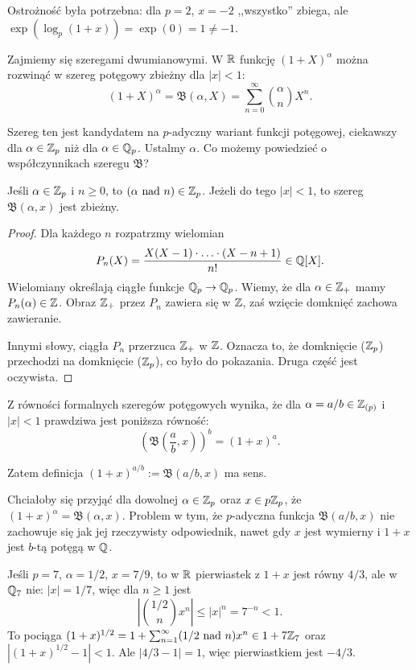 Ostrożność była potrzebna: dla $p = 2$, $x = -2$ ,,wszystko'' zbiega, ale $\exp(\log_p(1+x)) = \exp(0) = 1 \neq -1$.

Zajmiemy się szeregami dwumianowymi.
W $\mathbb{R}$ funkcję $(1+X)^\alpha$ można rozwinąć w szereg potęgowy zbieżny dla $|x| < 1$:
\[
	(1+X)^\alpha = \mathfrak B(\alpha, X) = \sum_{n=0}^\infty {\alpha \choose n} X^n.
\]

Szereg ten jest kandydatem na $p$-adyczny wariant funkcji potęgowej, ciekawszy dla $\alpha \in \mathbb{Z}_p$ niż dla $\alpha \in \mathbb{Q}_p$.
Ustalmy $\alpha$.
Co możemy powiedzieć o współczynnikach szeregu $\mathfrak B$?

\begin{fakt}
	Jeśli $\alpha \in \mathbb{Z}_p$ i $n \ge 0$, to $(\alpha \textrm{ nad } n) \in \mathbb{Z}_p$.
	Jeżeli do tego $|x| < 1$, to szereg $\mathfrak B(\alpha, x)$ jest zbieżny.
\end{fakt}

\begin{proof}
	Dla każdego $n$ rozpatrzmy wielomian
	\[
		P_n(X) = \frac{X(X-1) \cdot \ldots \cdot (X-n+1)}{n!} \in \mathbb{Q}[X].
	\]
	Wielomiany określają ciągłe funkcje $\mathbb{Q}_p \to \mathbb{Q}_p$.
	Wiemy, że dla $\alpha \in \mathbb{Z}_+$ mamy $P_n(\alpha) \in \mathbb{Z}$.
	Obraz $\mathbb{Z}_+$ przez $P_n$ zawiera się w $\mathbb{Z}$, zaś wzięcie domknięć zachowa zawieranie.

	Innymi słowy, ciągła $P_n$ przerzuca $\mathbb{Z}_+$ w $\mathbb{Z}$.
	Oznacza to, że domknięcie ($\mathbb{Z}_p$) przechodzi na domknięcie ($\mathbb{Z}_p$), co było do pokazania.
	Druga część jest oczywista.
\end{proof}

Z równości formalnych szeregów potęgowych wynika, że dla $\alpha = a/b \in \mathbb{Z}_{(p)}$ i $|x| < 1$ prawdziwa jest poniższa równość:
\[
	\left(\mathfrak B\left(\frac ab, x\right)\right)^b = (1+x)^a.
\]

Zatem definicja $(1+x)^{a/b}:=\mathfrak B (a/b, x)$ ma sens.

Chciałoby się przyjąć dla dowolnej $\alpha \in \mathbb{Z}_p$ oraz $x \in p\mathbb{Z}_p$, że $(1+x)^\alpha = \mathfrak B(\alpha, x)$.
Problem w tym, że $p$-adyczna funkcja $\mathfrak B(a/b, x)$ nie zachowuje się jak jej rzeczywisty odpowiednik, nawet gdy $x$ jest wymierny i $1+x$ jest $b$-tą potęgą w $\mathbb{Q}$.

\begin{przyklad}[Koblitz]
	Jeśli $p = 7$, $\alpha = 1/2$, $x = 7/9$, to w $\mathbb{R}$ pierwiastek z $1+x$ jest równy $4/3$, ale w $\mathbb{Q}_7$ nie: $|x| = 1/7$, więc dla $n \ge 1$ jest
	\[
		\left|{1/2 \choose n} x^n\right| \le |x|^n = 7^{-n} < 1.
	\]
	To pociąga $(1+x)^{1/2} = 1 + \sum_{n = 1}^\infty (1/2 \textrm{ nad } n) x^n \in 1 + 7\mathbb{Z}_7$ oraz $|(1+x)^{1/2} - 1| < 1$.
	Ale $|4/3 - 1| = 1$, więc pierwiastkiem jest $-4/3$.
\end{przyklad}

